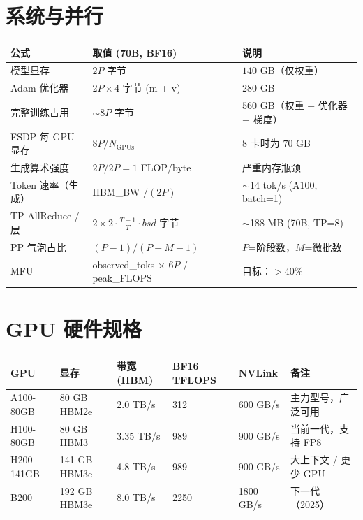 \section{系统与并行}
\label{systems-parallelism}

\noindent\begin{tabularx}{\linewidth}{@{}l Z{1.07} Z{0.93}@{}}
\toprule
\textbf{公式} & \textbf{取值 (70B, BF16)} & \textbf{说明} \\
\midrule
模型显存 & $2P$ 字节 & $140$ GB（仅权重） \\
Adam 优化器 & $2P \times 4$ 字节 (m + v) & $280$ GB \\
完整训练占用 & $\sim 8P$ 字节 & $560$ GB（权重 + 优化器 + 梯度） \\
FSDP 每 GPU 显存 & $8P / N_\text{GPUs}$ & 8 卡时为 $70$ GB \\
生成算术强度 & $2P / 2P = 1$ FLOP/byte & 严重内存瓶颈 \\
Token 速率（生成） & HBM\_BW $/ (2P)$ & $\sim$14 tok/s (A100, batch=1) \\
TP AllReduce / 层 & $2 \times 2 \cdot \frac{T-1}{T} \cdot bsd$ 字节 & $\sim$188 MB (70B, TP=8) \\
PP 气泡占比 & $(P-1)/(P+M-1)$ & $P$=阶段数，$M$=微批数 \\
MFU & observed\_toks $\times$ 6$P$ / peak\_FLOPS & 目标：$>40\%$ \\
\bottomrule
\end{tabularx}

\section{GPU 硬件规格}
\label{gpu-hardware-specs}

{\footnotesize
\noindent\begin{tabularx}{\linewidth}{@{}l l l l l Z{1}@{}}
\toprule
\textbf{GPU} & \textbf{显存} & \textbf{带宽 (HBM)} & \textbf{BF16 TFLOPS} & \textbf{NVLink} & \textbf{备注} \\
\midrule
A100-80GB & 80 GB HBM2e & 2.0 TB/s & 312 & 600 GB/s & 主力型号，广泛可用 \\
H100-80GB & 80 GB HBM3 & 3.35 TB/s & 989 & 900 GB/s & 当前一代，支持 FP8 \\
H200-141GB & 141 GB HBM3e & 4.8 TB/s & 989 & 900 GB/s & 大上下文 / 更少 GPU \\
B200 & 192 GB HBM3e & 8.0 TB/s & 2250 & 1800 GB/s & 下一代（2025） \\
\bottomrule
\end{tabularx}
}

